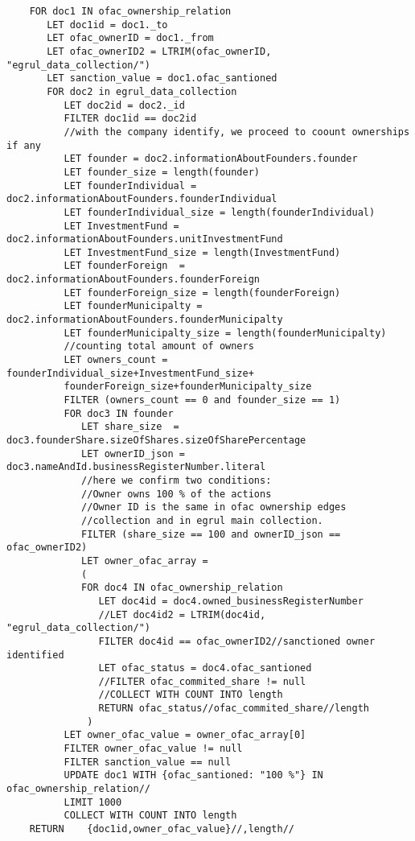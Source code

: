 \begin{enumerate}
\begin{verbatim}
	FOR doc1 IN ofac_ownership_relation
	   LET doc1id = doc1._to
	   LET ofac_ownerID = doc1._from
	   LET ofac_ownerID2 = LTRIM(ofac_ownerID, "egrul_data_collection/") 
	   LET sanction_value = doc1.ofac_santioned
	   FOR doc2 in egrul_data_collection
	      LET doc2id = doc2._id
	      FILTER doc1id == doc2id
	      //with the company identify, we proceed to coount ownerships if any
	      LET founder = doc2.informationAboutFounders.founder
          LET founder_size = length(founder)
	      LET founderIndividual = doc2.informationAboutFounders.founderIndividual
	      LET founderIndividual_size = length(founderIndividual)
	      LET InvestmentFund = doc2.informationAboutFounders.unitInvestmentFund
	      LET InvestmentFund_size = length(InvestmentFund)
	      LET founderForeign  = doc2.informationAboutFounders.founderForeign
 	      LET founderForeign_size = length(founderForeign)
	      LET founderMunicipalty = doc2.informationAboutFounders.founderMunicipalty
	      LET founderMunicipalty_size = length(founderMunicipalty)
	      //counting total amount of owners
	      LET owners_count = founderIndividual_size+InvestmentFund_size+
	      founderForeign_size+founderMunicipalty_size
	      FILTER (owners_count == 0 and founder_size == 1)
	      FOR doc3 IN founder
	         LET share_size  = doc3.founderShare.sizeOfShares.sizeOfSharePercentage
	         LET ownerID_json = doc3.nameAndId.businessRegisterNumber.literal
	         //here we confirm two conditions:
	         //Owner owns 100 % of the actions
	         //Owner ID is the same in ofac ownership edges 
	         //collection and in egrul main collection. 
	         FILTER (share_size == 100 and ownerID_json == ofac_ownerID2)
	         LET owner_ofac_array = 
	         (
	         FOR doc4 IN ofac_ownership_relation
	            LET doc4id = doc4.owned_businessRegisterNumber
	            //LET doc4id2 = LTRIM(doc4id, "egrul_data_collection/") 
	            FILTER doc4id == ofac_ownerID2//sanctioned owner identified
	            LET ofac_status = doc4.ofac_santioned
	            //FILTER ofac_commited_share != null
	            //COLLECT WITH COUNT INTO length
	            RETURN ofac_status//ofac_commited_share//length
	          )
	      LET owner_ofac_value = owner_ofac_array[0]
	      FILTER owner_ofac_value != null
	      FILTER sanction_value == null
	      UPDATE doc1 WITH {ofac_santioned: "100 %"} IN ofac_ownership_relation//
	      LIMIT 1000
	      COLLECT WITH COUNT INTO length
	RETURN    {doc1id,owner_ofac_value}//,length//
	\end{verbatim}
	

\end{enumerate}
